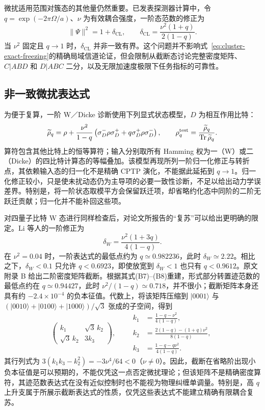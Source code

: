 \documentclass[UTF8,11pt,a4paper,fontset=none]{ctexart}
\newcommand{\Tr}{\operatorname{Tr}}
\begin{document}
微扰适用范围对簇态的其他量仍然重要。已发表探测器计算中，令 $q=\exp(-2\pi\Omega/a)$、$\nu$ 为有效耦合强度，一阶态范数的修正为
\begin{equation}
\|\Psi\|^2=1+\delta_{\mathrm{CL}},\qquad
\delta_{\mathrm{CL}}=\frac{\nu^2(1+q)}{2(1-q)}.
\label{eq:cluster-perturbative-control}
\end{equation}
当 $\nu^2$ 固定且 $q\to1$ 时，$\delta_{\mathrm{CL}}$ 并非一致有界。这个问题并不影响式~\eqref{eq:cluster-exact-freezing}的精确局域信道论证，但会限制从截断态讨论完整密度矩阵、$C|ABD$ 和 $D|ABC$ 二分，以及无限加速度极限下任务指标的可靠性。

\subsection{非一致微扰表达式}
为便于复算，一阶 W／Dicke 诊断使用下列显式状态模型，$D$ 为相互作用比特：
\begin{equation}
\widetilde\rho_q=\rho+\frac{\nu^2}{1-q}
\left(\sigma_D^-\rho\sigma_D^++q\sigma_D^+\rho\sigma_D^-\right),\qquad
\rho_q^{\rm test}=\frac{\widetilde\rho_q}{\Tr\widetilde\rho_q}.
\label{eq:first-order-diagnostic-model}
\end{equation}
算符包含其他比特上的恒等算符；输入分别取所有 Hamming 权为一（W）或二（Dicke）的四比特计算态的等幅叠加。该模型再现所列一阶归一化修正与转折点，其依赖输入态的归一化不是精确 CPTP 演化，不能据此延拓到 $q\to1$。归一化修正较小，只是使未扰动态仍为主导项的必要一致性诊断，不足以给出动力学误差界。特别是，将一阶状态取模平方会保留跃迁项，却省略约化态中同阶的二阶无跃迁贡献；归一化并不能补回这些项。


对四量子比特 W 态进行同样检查后，对论文所报告的“复苏”可以给出更明确的限定。Li 等人的一阶修正为 \cite{LiWState2025}
\begin{equation}
\delta_W=\frac{\nu^2(1+3q)}{4(1-q)}.
\label{eq:w-control}
\end{equation}
在 $\nu^2=0.04$ 时，一阶表达式的最低点约为 $q\simeq0.982236$，此时 $\delta_W\simeq2.22$。相比之下，$\delta_W<0.1$ 只允许 $q<0.6923$，即使放宽到 $\delta_W<1$ 也只有 $q<0.9612$。原文附录 B 给出二阶密度矩阵截断。根据其式(B7)--(B8)重建，形式部分转置迹范数的最低点约在 $q\simeq0.94427$，此时 $\nu^2/(1-q)\simeq0.718$，并不很小；截断矩阵本身还具有约 $-2.4\times10^{-4}$ 的负本征值。代数上，将该矩阵压缩到 $|0001\rangle$ 与 $(|0010\rangle+|0100\rangle+|1000\rangle)/\sqrt3$ 张成的子空间，得到
\begin{equation}
\begin{pmatrix}k_1&\sqrt3\,k_2\\\sqrt3\,k_2&3k_3\end{pmatrix},\qquad
\begin{aligned}
k_1&=\frac{1-q-\nu^2}{4(1-q)},\\
k_2&=\frac{2(1-q)-(1+q)\nu^2}{8(1-q)},\\
k_3&=\frac{1-q-q\nu^2}{4(1-q)}.
\end{aligned}
\end{equation}
其行列式为 $3(k_1k_3-k_2^2)=-3\nu^4/64<0$（$\nu\ne0$）。因此，截断在省略阶出现小负本征值是可以预期的，不能仅凭这一点否定微扰理论；但该矩阵不是精确密度算符，其迹范数表达式在没有近似控制时也不能视为物理纠缠单调量。特别是，高 $q$ 上升支属于所展示截断表达式的性质，仅凭这些表达式不能建立精确有限耦合复苏。
\end{document}
